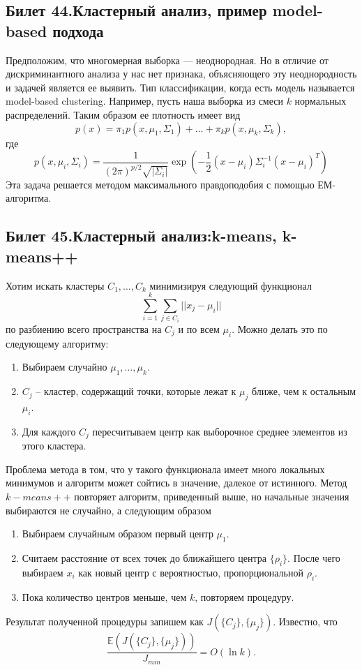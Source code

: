 \subsection{Билет 44.Кластерный	анализ,	пример	model-based	подхода}
Предположим, что многомерная выборка --- неоднородная. Но в отличие от дискриминантного анализа у нас нет признака, объясняющего эту неоднородность и задачей является ее выявить.
Тип классификации, когда есть модель называется model-based clustering.
Например, пусть наша выборка из смеси $k$ нормальных распределений. Таким образом ее плотность имеет вид
\begin{equation}
p(x) = \pi_1 p(x, \mu_1, \Sigma_1) + \ldots + \pi_k p(x, \mu_k, \Sigma_k),
\end{equation}
где
\begin{equation}
p(x, \mu_i, \Sigma_i) = \frac{1}{(2\pi)^{p/2}\sqrt{|\Sigma_i|}}
\exp \left(-\frac{1}{2}(x - \mu_i)\Sigma_i^{-1}(x - \mu_i)^T \right)
\end{equation}
Эта задача решается методом максимального правдоподобия с помощью ЕМ-алгоритма.

\subsection{Билет 45.Кластерный	анализ:k-means,	k-means++}
Хотим искать кластеры $C_1, \ldots, C_k$ минимизируя следующий функционал
\begin{equation}
\sum\limits_{i = 1}^k \sum\limits_{j \in C_i} ||x_j - \mu_i||
\label{func_lin}
\end{equation}
по разбиению всего пространства на $C_j$ и по всем $\mu_i$.
Можно делать это по следующему алгоритму:
\begin{enumerate}
\item Выбираем случайно $\mu_1, \ldots, \mu_k$.
\item $C_j$ -- кластер, содержащий точки, которые лежат к $\mu_j$ ближе, чем к остальным $\mu_i$.
\item Для каждого $C_j$ пересчитываем центр как выборочное среднее элементов из этого кластера.
\end{enumerate}
Проблема метода в том, что у такого функционала имеет много локальных минимумов и алгоритм может сойтись в значение, далекое от истинного.
Метод $k-means ++$ повторяет алгоритм, приведенный выше, но начальные значения выбираются не случайно, а следующим образом
\begin{enumerate}
\item Выбираем случайным образом первый центр $\mu_1$.
\item Считаем расстояние от всех точек до ближайшего центра $\{\rho_i\}$. После чего выбираем $x_i$ как новый центр с вероятностью, пропорциональной $\rho_i$.
\item Пока количество центров меньше, чем $k$, повторяем процедуру.
\end{enumerate}
Результат полученной процедуры запишем как $J(\{C_j\}, \{\mu_j\})$.
Известно, что
\begin{equation*}
\frac{\mathbb{E}(J(\{C_j\}, \{\mu_j\}))}{J_{min}} = O(\ln k ).
\end{equation*}
